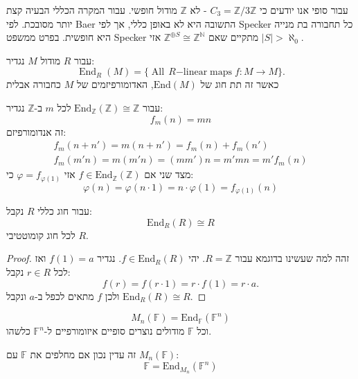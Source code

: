 \documentclass{tstextbook}
\begin{document}
\begin{example}
עבור סופי אנו יודעים כי \(C_{3}=\mathbb{Z} / 3\mathbb{Z}\) - לא \(\mathbb{Z}\) מודול חופשי.
עבור המקרה הכללי הבעיה קצת יותר מסובכת. לפי Baer התשובה היא לא באופן כללי, אך לפי Specker כל תחבורה בת מנייה היא חופשית. בפרט ממשפט Specker מתקיים שאם \(\mathbb{Z}^{\oplus S}\cong \mathbb{Z}^{\mathbb{N}}\) אזי \(\lvert S \rvert> \aleph_{0}\).

\end{example}
\begin{definition}
עבור \(R\) מודול \(M\) נגדיר:
$$\operatorname{End}_{R}(M)=\{\operatorname{All}\,R{\mathrm{-linear\;maps}}\;f:M\to M\}.$$
כאשר זה תת חוג של \(\mathrm{End}(M)\), האדומורפיזמים של \(M\) כחבורה אבלית

\end{definition}
\begin{example}
עבור \(\mathrm{End}_{\mathbb{Z}}(\mathbb{Z})\cong \mathbb{Z}\) לכל \(m\) ב-\(\mathbb{Z}\) נגדיר:
$$f_{m}(n)=mn$$
זה אנדומורפיזם:
$$\begin{gather}f_{m}(n+n')=m(n+n')=f_{m}(n)+f_{m}(n')\\ f_{m}(m'n)=m(m'n)=(mm')n=m'mn=m'f_{m}(n)
\end{gather}$$
מצד שני אם \(f \in \mathrm{End}_{\mathbb{Z}}(\mathbb{Z})\) אזי \(\varphi=f_{\varphi(1)}\) כי:
$$\varphi(n)=\varphi(n\cdot 1)=n\cdot \varphi( 1)=f_{\varphi(1)}(n)$$

\end{example}
\begin{corollary}
עבור חוג כללי \(R\) נקבל:
$$\mathrm{End}_{R}(R)\cong  R$$
לכל חוג קומוטטיבי \(R\).

\end{corollary}
\begin{proof}
זהה למה שעשינו בדוגמא עבור \(R=\mathbb{Z}\). יהי \(f \in \mathrm{End}_{R}(R)\). נגדיר \(f(1)=a\) ואז לכל \(r \in R\) נקבל:
$$f(r)=f(r\cdot1)=r\cdot f(1)=r\cdot a.$$
ולכן \(f\) מתאים לכפל ב-\(a\) ונקבל \(\mathrm{End}_{R}(R)\cong R\).

\end{proof}
\begin{proposition}
$$M_{n}(\mathbb{F} )=\mathrm{End}_{\mathbb{F} }(\mathbb{F} ^{n})$$
וכל \(\mathbb{F}\) מודולים נוצרים סופיים איזומורפיים ל-\(\mathbb{F}^{n}\) כלשהו.

\end{proposition}
\begin{remark}
זה עדין נכון אם מחלפים את \(\mathbb{F}\) עם \(M_{n}(\mathbb{F})\):
$$\mathbb{F} = \mathrm{End}_{M_{n}}(\mathbb{F}^{n} )$$

\end{remark}
\end{document}
